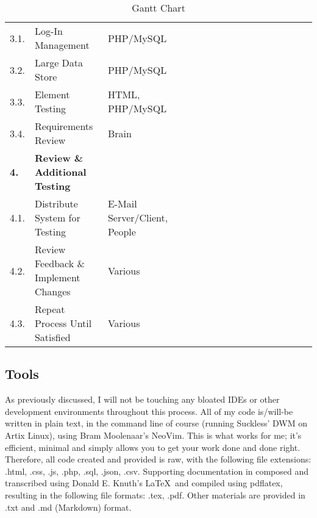 \documentclass[11pt, english]{article}
\begin{document}
\begin{landscape}
\begin{table}[h]
\begin{center}
\begin{tabular}{lll|cccccccccccccc}
		3.1. & Log-In Management & PHP/MySQL & & & & & & & & \cellcolor[gray]{0.1} & \cellcolor[gray]{0.1} & \cellcolor[gray]{0.1} & \cellcolor[gray]{0.1}\\
		3.2. & Large Data Store & PHP/MySQL & & & & & & & & \cellcolor[gray]{0.1} & \cellcolor[gray]{0.1} & \cellcolor[gray]{0.1} & \cellcolor[gray]{0.1}\\
		3.3. & Element Testing & HTML, PHP/MySQL & & & & & & & & & & \cellcolor[gray]{0.1} & \cellcolor[gray]{0.1} & \cellcolor[gray]{0.1}\\
		3.4. & Requirements Review & Brain & & & & & & & & & & & & \cellcolor[gray]{0.1}\\
		\hline
		\textbf{4.} & \textbf{Review \& Additional Testing}\\
		4.1. & Distribute System for Testing & E-Mail Server/Client, People & & & & & & & & & & & & \cellcolor[gray]{0.1} & \cellcolor[gray]{0.1}\\
		4.2. & Review Feedback \& Implement Changes & Various & & & & & & & & & & & & \cellcolor[gray]{0.1} & \cellcolor[gray]{0.1}\\
		4.3. & Repeat Process Until Satisfied & Various & & & & & & & & & & & & \cellcolor[gray]{0.1} & \cellcolor[gray]{0.1}\\
		\hline
	\end{tabular}
		\caption{Gantt Chart}
	\end{center}
	\end{table}

\end{landscape}

\newpage

	\subsection{Tools}

	As previously discussed, I will not be touching any bloated IDEs or other development environments throughout this process. All of my code is/will-be written in plain text, in the command line of course (running Suckless' DWM on Artix Linux), using Bram Moolenaar's NeoVim. This is what works for me; it's efficient, minimal and simply allows you to get your work done and done right. Therefore, all code created and provided is raw, with the following file extensions: .html, .css, .js, .php, .sql, .json, .csv. Supporting documentation in composed and transcribed using Donald E. Knuth's \LaTeX\ and compiled using pdflatex, resulting in the following file formats: .tex, .pdf. Other materials are provided in .txt and .md (Markdown) format.\\
\end{document}
